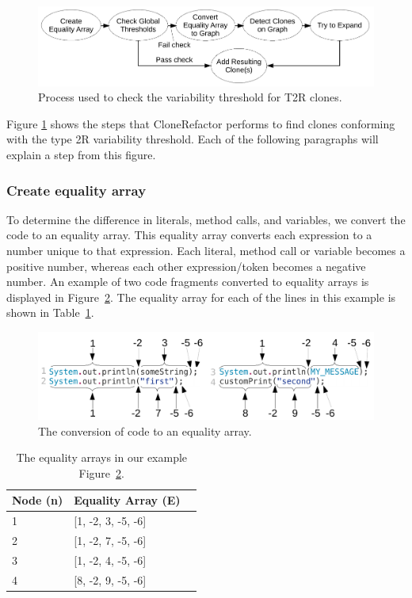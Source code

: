 \begin{figure}[H]
  \centering
  \includegraphics[width=1\columnwidth]{img/CloneRefactorT2RFlow}
  \caption{Process used to check the variability threshold for T2R clones.}
  \label{fig:clonerefactort2rflow}
\end{figure}

Figure \ref{fig:clonerefactort2rflow} shows the steps that CloneRefactor performs to find clones conforming with the type 2R variability threshold. Each of the following paragraphs will explain a step from this figure.

\subsubsection{Create equality array}
To determine the difference in literals, method calls, and variables, we convert the code to an equality array. This equality array converts each expression to a number unique to that expression. Each literal, method call or variable becomes a positive number, whereas each other expression/token becomes a negative number. An example of two code fragments converted to equality arrays is displayed in Figure~\ref{fig:equalityarrays}. The equality array for each of the lines in this example is shown in Table~\ref{table:equalityarrays}.

\begin{figure}[H]
  \centering
  \includegraphics[width=1\columnwidth]{img/equality}
  \caption{The conversion of code to an equality array.}
  \label{fig:equalityarrays}
\end{figure}

\begin{table}[H]
\begin{center}
\begin{tabular}{|l|l|l|}
\hline
Node (n) & Equality Array (E) \\ \hline
1        & {[}1, -2, 3, -5, -6{]} \\ \hline
2        & {[}1, -2, 7, -5, -6{]} \\ \hline
3        & {[}1, -2, 4, -5, -6{]} \\ \hline
4        & {[}8, -2, 9, -5, -6{]} \\ \hline
\end{tabular}
\caption{The equality arrays in our example Figure~\ref{fig:equalityarrays}.} \label{table:equalityarrays}
\end{center}
\end{table}

